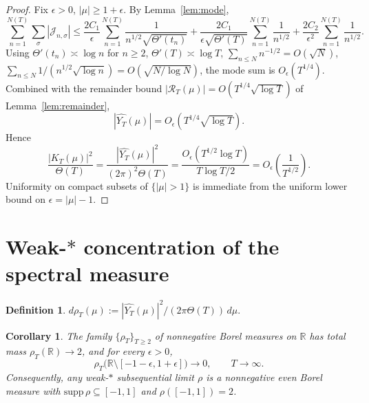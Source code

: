 \documentclass[11pt]{article}
\newtheorem{corollary}[theorem]{Corollary}
\theoremstyle{definition}
\newtheorem{definition}[theorem]{Definition}
\newcommand{\R}{\mathbb{R}}
\begin{document}
\begin{proof}
Fix $\epsilon > 0$, $|\mu| \geq 1 + \epsilon$. By Lemma~\ref{lem:mode},
\[
\sum_{n=1}^{N(T)}\sum_\sigma |\mathcal J_{n,\sigma}| \leq \frac{2C_1}{\epsilon}\sum_{n=1}^{N(T)}\frac{1}{n^{1/2}\sqrt{\Theta'(t_n)}} + \frac{2C_1}{\epsilon\sqrt{\Theta'(T)}}\sum_{n=1}^{N(T)}\frac{1}{n^{1/2}} + \frac{2C_2}{\epsilon^2}\sum_{n=1}^{N(T)}\frac{1}{n^{1/2}}.
\]
Using $\Theta'(t_n) \asymp \log n$ for $n \geq 2$, $\Theta'(T) \asymp \log T$, $\sum_{n \leq N}n^{-1/2} = O(\sqrt N)$, $\sum_{n \leq N}1/(n^{1/2}\sqrt{\log n}) = O(\sqrt{N/\log N})$, the mode sum is $O_\epsilon(T^{1/4})$. Combined with the remainder bound $|\mathcal R_T(\mu)| = O(T^{1/4}\sqrt{\log T})$ of Lemma~\ref{lem:remainder},
\[
|\widehat{Y_T}(\mu)| = O_\epsilon(T^{1/4}\sqrt{\log T}).
\]
Hence
\[
\frac{|K_T(\mu)|^2}{\Theta(T)} = \frac{|\widehat{Y_T}(\mu)|^2}{(2\pi)^2\Theta(T)} = \frac{O_\epsilon(T^{1/2}\log T)}{T\log T/2} = O_\epsilon\!\left(\frac{1}{T^{1/2}}\right).
\]
Uniformity on compact subsets of $\{|\mu| > 1\}$ is immediate from the uniform lower bound on $\epsilon = |\mu| - 1$.
\end{proof}

\section{Weak-$*$ concentration of the spectral measure}

\begin{definition}
$d\rho_T(\mu) := |\widehat{Y_T}(\mu)|^2/(2\pi\Theta(T))\,d\mu$.
\end{definition}

\begin{corollary}\label{cor:support}
The family $\{\rho_T\}_{T \geq 2}$ of nonnegative Borel measures on $\R$ has total mass $\rho_T(\R) \to 2$, and for every $\epsilon > 0$,
\[
\rho_T\big(\R\setminus[-1-\epsilon,1+\epsilon]\big) \longrightarrow 0, \qquad T \to \infty.
\]
Consequently, any weak-$*$ subsequential limit $\rho$ is a nonnegative even Borel measure with $\mathrm{supp}\,\rho \subseteq [-1,1]$ and $\rho([-1,1]) = 2$.
\end{corollary}
\end{document}
